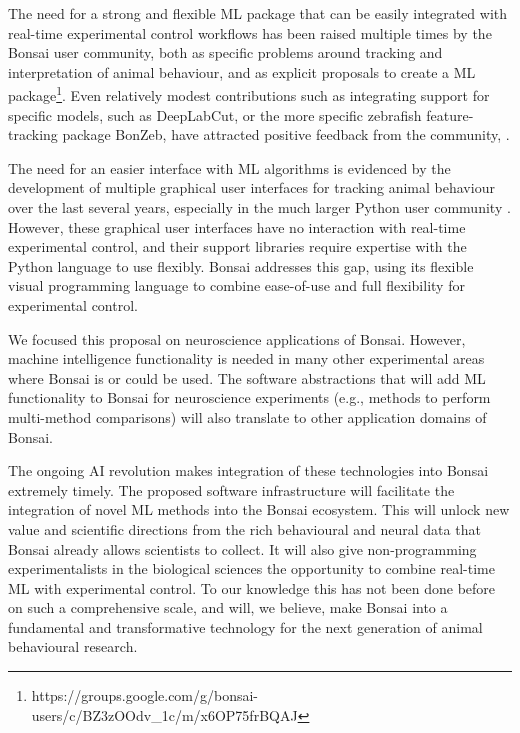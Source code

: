 The need for a strong and
flexible ML package that can be easily integrated with
real-time experimental control workflows has been raised multiple times by the
Bonsai user community, both as specific problems around 
tracking and interpretation of animal behaviour, and as 
explicit proposals to create a ML
package\footnote{https://groups.google.com/g/bonsai-users/c/BZ3zOOdv\_1c/m/x6OP75frBQAJ}. Even
relatively modest contributions such as integrating support for specific models, such as DeepLabCut, or the more specific zebrafish feature-tracking package BonZeb, have attracted positive
feedback from the community, \citep[e.g.,][]{kaneEtAl20,guilbeaultEtAl21}.

The need for an easier interface with ML algorithms
is evidenced by the development of multiple graphical user interfaces for
tracking animal behaviour over the last several years, especially in the much
larger Python user community
\citep[e.g.,][]{walterAndCouzin21,guilbeaultEtAl21}. However, these graphical
user interfaces have no interaction with real-time experimental control, and
their support libraries require expertise with the Python language
to use flexibly. Bonsai addresses this gap, using its
flexible visual programming language to combine ease-of-use and full
flexibility for experimental control.

We focused this proposal on neuroscience applications of Bonsai. However, machine intelligence functionality is needed in many other
experimental areas where Bonsai is or could be used. The software
abstractions that will add ML
functionality to Bonsai for neuroscience experiments (e.g., methods to perform
multi-method comparisons) will also translate to other application domains of
Bonsai.

The ongoing AI revolution makes integration of these
technologies into Bonsai extremely timely. The proposed software infrastructure will facilitate the integration of novel ML methods into the Bonsai
ecosystem. This will unlock new value
and scientific directions from the rich behavioural and neural data that Bonsai already allows scientists to collect. It will also give non-programming experimentalists in the biological
sciences the opportunity to combine real-time ML with
experimental control. To our knowledge
this has not been done before on such a comprehensive scale, and will, we believe, make Bonsai into a fundamental and transformative technology for
the next generation of animal behavioural research.

